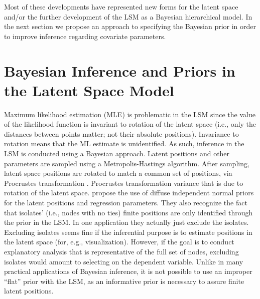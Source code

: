 \documentclass[11pt]{article}
\begin{document}
 Most of these developments have represented new forms for the latent space and/or the further development of the LSM as a Bayesian hierarchical model. In the next section we propose an approach to specifying the Bayesian prior in order to improve inference regarding covariate parameters. 

\section{Bayesian Inference and Priors in the Latent Space Model}

Maximum likelihood estimation (MLE) is problematic in the LSM since the value of the likelihood function is invariant to rotation of the latent space \citep{hoff2002latent} (i.e., only the distances between points matter; not their absolute positions). Invariance to rotation means that the ML estimate is unidentified. As such, inference in the LSM is conducted using a Bayesian approach. Latent positions and other parameters are sampled using a Metropolis-Hastings algorithm. After sampling, latent space positions are rotated to match a common set of positions, via Procrustes transformation \citep{borg2005modern}. Procrustes transformation variance that is due to rotation of the latent space.  \cite{hoff2002latent} propose the use of diffuse independent normal priors for the latent positions and regression parameters. They also recognize the fact that isolates' (i.e., nodes with no ties) finite positions are only identified through the prior in the LSM. In one application they actually just exclude the isolates. Excluding isolates seems fine if the inferential purpose is to estimate positions in the latent space (for, e.g., visualization). However, if the goal is to conduct explanatory analysis that is representative of the full set of nodes, excluding isolates would amount to selecting on the dependent variable. Unlike in many practical applications of Bayesian inference, it is not possible to use an improper ``flat'' prior \citep{tibshirani1989noninformative} with the LSM, as an informative prior is necessary to assure finite latent positions.
\end{document}
